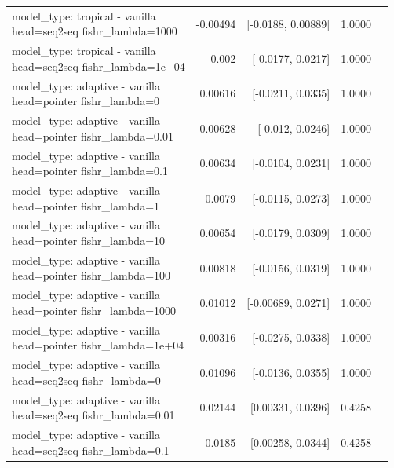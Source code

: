 \documentclass[10pt]{article}
\makeatletter
\newcommand{\stackcell}[1]{\begin{tabular}[t]{@{}l@{}}#1\end{tabular}}
\makeatother
\begin{document}
{\begin{longtable}{lrrrl}
\stackcell{model\_type: tropical - vanilla\\\footnotesize head=seq2seq fishr\_lambda=1000 } & -0.00494 & [-0.0188, 0.00889] & 1.0000 & \\
\stackcell{model\_type: tropical - vanilla\\\footnotesize head=seq2seq fishr\_lambda=1e+04 } & 0.002 & [-0.0177, 0.0217] & 1.0000 & \\
\stackcell{model\_type: adaptive - vanilla\\\footnotesize head=pointer fishr\_lambda=0 } & 0.00616 & [-0.0211, 0.0335] & 1.0000 & \\
\stackcell{model\_type: adaptive - vanilla\\\footnotesize head=pointer fishr\_lambda=0.01 } & 0.00628 & [-0.012, 0.0246] & 1.0000 & \\
\stackcell{model\_type: adaptive - vanilla\\\footnotesize head=pointer fishr\_lambda=0.1 } & 0.00634 & [-0.0104, 0.0231] & 1.0000 & \\
\stackcell{model\_type: adaptive - vanilla\\\footnotesize head=pointer fishr\_lambda=1 } & 0.0079 & [-0.0115, 0.0273] & 1.0000 & \\
\stackcell{model\_type: adaptive - vanilla\\\footnotesize head=pointer fishr\_lambda=10 } & 0.00654 & [-0.0179, 0.0309] & 1.0000 & \\
\stackcell{model\_type: adaptive - vanilla\\\footnotesize head=pointer fishr\_lambda=100 } & 0.00818 & [-0.0156, 0.0319] & 1.0000 & \\
\stackcell{model\_type: adaptive - vanilla\\\footnotesize head=pointer fishr\_lambda=1000 } & 0.01012 & [-0.00689, 0.0271] & 1.0000 & \\
\stackcell{model\_type: adaptive - vanilla\\\footnotesize head=pointer fishr\_lambda=1e+04 } & 0.00316 & [-0.0275, 0.0338] & 1.0000 & \\
\stackcell{model\_type: adaptive - vanilla\\\footnotesize head=seq2seq fishr\_lambda=0 } & 0.01096 & [-0.0136, 0.0355] & 1.0000 & \\
\stackcell{model\_type: adaptive - vanilla\\\footnotesize head=seq2seq fishr\_lambda=0.01 } & 0.02144 & [0.00331, 0.0396] & 0.4258 & \\
\stackcell{model\_type: adaptive - vanilla\\\footnotesize head=seq2seq fishr\_lambda=0.1 } & 0.0185 & [0.00258, 0.0344] & 0.4258 & \\

\end{longtable}}
\end{document}
